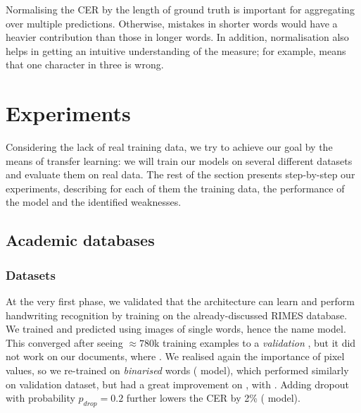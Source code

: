 			Normalising the CER by the length of ground truth is important for aggregating over multiple predictions. Otherwise, mistakes in shorter words would have a heavier contribution than those in longer words. In addition, normalisation also helps in getting an intuitive understanding of the measure; for example,  means that one character in three is wrong.



\section{Experiments}\label{sec:transcription_experiments}
	Considering the lack of real training data, we try to achieve our goal by the means of transfer learning: we will train our models on several different datasets and evaluate them on real data. The rest of the section presents step-by-step our experiments, describing for each of them the training data, the performance of the model and the identified weaknesses.


	\subsection{Academic databases}
		\subsubsection*{Datasets}
			At the very first phase, we validated that the architecture can learn and perform handwriting recognition by training on the already-discussed RIMES database. We trained and predicted using images of single words, hence the name  model. This converged after seeing \(\approx 780\)k training examples to a \emph{validation} ,	but it did not work on our documents, where . We realised again the importance of pixel values, so we re-trained on \emph{binarised} words ( model), which performed similarly on validation dataset, but had a great improvement on , with . Adding dropout with probability \(p_\mathit{drop} = 0.2\) further lowers the CER by 2\% ( model).

